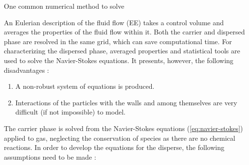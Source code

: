 One common numerical method to solve

An Eulerian description of the fluid flow (EE) takes a control volume and averages the properties of the fluid flow within it. Both the carrier and dispersed phase are resolved in the same grid, which can save computational time. For characterizing the dispersed phase, averaged properties and statistical tools are used to solve the Navier-Stokes equations. It presents, however, the following disadvantages :

\begin{enumerate}

\item A non-robust system of equations is produced.

\item Interactions of the particles with the walls and among themselves are very difficult (if not impossible) to model.

\end{enumerate}

The carrier phase is solved from the Navier-Stokes equations (\ref{eq:navier-stokes}) applied to gas, neglecting the conservation of species as there are no chemical reactions. In order to develop the equations for the disperse, the following assumptions need to be made :

